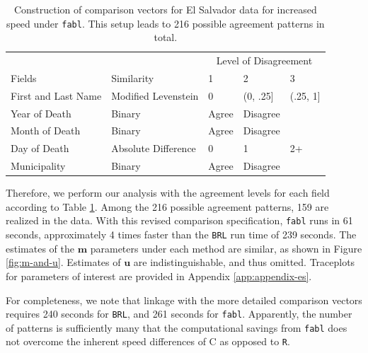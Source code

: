 \documentclass[ba]{imsart}
\begin{document}
	\begin{table}[t]
	\centering
	\begin{tabular}[t]{lllll}
		\multicolumn{2}{c}{ } & \multicolumn{3}{c}{Level of Disagreement} \\
		\cline{3-5}
		Fields & Similarity & 1 & 2 & 3\\
		\hline
		First and Last Name & Modified Levenstein & 0 & (0, .25] & (.25, 1]\\
		Year of Death & Binary & Agree & Disagree & \\
		Month of Death & Binary & Agree & Disagree & \\
		Day of Death & Absolute Difference & 0 & 1 & 2+\\
		Municipality & Binary & Agree & Disagree & \\
		\hline
	\end{tabular}
	\caption{Construction of comparison vectors for El Salvador data for increased speed under \texttt{fabl}. This setup leads to 216 possible agreement patterns in total.}\label{Tab:el_salvador_cutoffs_2}
\end{table}
	
	Therefore, we perform our analysis with the agreement levels for each field according to Table \ref{Tab:el_salvador_cutoffs_2}. Among the 216 possible agreement patterns, 159 are realized in the data. With this revised comparison specification, \texttt{fabl} runs in 61 seconds, approximately 4 times faster than the \texttt{BRL} run time of 239 seconds.  The estimates of the $\bm{m}$ parameters under each method are similar, as shown in Figure \ref{fig:m-and-u}. Estimates of $\bm{u}$ are indistinguishable, and thus omitted. Traceplots for parameters of interest are provided in Appendix \ref{app:appendix-es}.
	
	For completeness, we note that linkage with the more detailed comparison vectors requires 240 seconds for \texttt{BRL}, and 261 seconds for \texttt{fabl}.  Apparently, the number of patterns is sufficiently many that the computational savings from \texttt{fabl} does not overcome the inherent speed differences of C as opposed to \texttt{R}.
	
\end{document}
